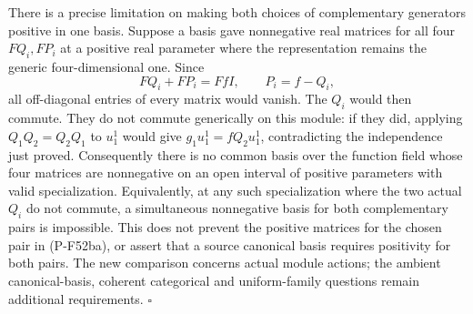 There is a precise limitation on making both choices of
complementary generators positive in one basis. Suppose
a basis gave nonnegative real matrices for all four
$FQ_i,FP_i$ at a positive real parameter where the
representation remains the generic four-dimensional one.
Since
\[
             FQ_i+FP_i=FfI,\qquad P_i=f-Q_i,
                                                               \tag{P-F52bc}
\]
all off-diagonal entries of every matrix would vanish.
The $Q_i$ would then commute. They do not commute
generically on this module: if they did, applying
$Q_1Q_2=Q_2Q_1$ to $u_1^1$ would give
$g_1u_1^1=fQ_2u_1^1$, contradicting the independence
just proved. Consequently there is no common basis over
the function field whose four matrices are nonnegative
on an open interval of positive parameters with valid
specialization. Equivalently, at any such specialization
where the two actual $Q_i$ do not commute, a simultaneous
nonnegative basis for both complementary pairs is
impossible. This does not prevent the positive matrices
for the chosen pair in (P-F52ba), or assert that a source
canonical basis requires positivity for both pairs.
The new comparison concerns actual module actions;
the ambient canonical-basis, coherent categorical and
uniform-family questions remain additional requirements.
\hfill$\square$

